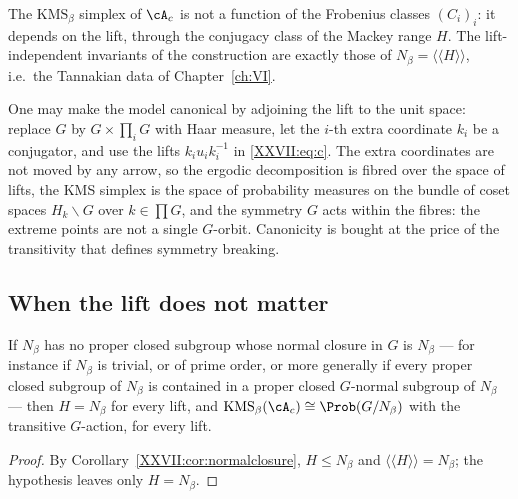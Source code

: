 \begin{corollary}\label{XXVII:cor:nocanonical}
The $\mathrm{KMS}_\beta$ simplex of $\cA_c$ is not a function of the Frobenius classes
$(C_i)_i$: it depends on the lift, through the conjugacy class of the Mackey range $H$. The
lift-independent invariants of the construction are exactly those of $N_\beta=\langle\langle H\rangle\rangle$,
i.e.\ the Tannakian data of Chapter~\ref{ch:VI}.
\end{corollary}

\begin{remark}
One may make the model canonical by adjoining the lift to the unit space: replace $G$ by
$G\times\prod_iG$ with Haar measure, let the $i$-th extra coordinate $k_i$ be a conjugator,
and use the lifts $k_iu_ik_i^{-1}$ in \eqref{XXVII:eq:c}. The extra coordinates are not moved by
any arrow, so the ergodic decomposition is fibred over the space of lifts, the KMS
simplex is the space of probability measures on the bundle of coset spaces
$H_k\backslash G$ over $k\in\prod G$, and the symmetry $G$ acts within the fibres: the
extreme points are not a single $G$-orbit. Canonicity is bought at the price of the
transitivity that defines symmetry breaking.
\end{remark}

\subsection{When the lift does not matter}

\begin{proposition}\label{XXVII:prop:rigid}
If $N_\beta$ has no proper closed subgroup whose normal closure in $G$ is $N_\beta$ --- for
instance if $N_\beta$ is trivial, or of prime order, or more generally if every proper
closed subgroup of $N_\beta$ is contained in a proper closed $G$-normal subgroup of
$N_\beta$ --- then $H=N_\beta$ for every lift, and
$\mathrm{KMS}_\beta(\cA_c)\cong\Prob(G/N_\beta)$ with the transitive $G$-action, for every lift.
\end{proposition}

\begin{proof}
By Corollary~\ref{XXVII:cor:normalclosure}, $H\le N_\beta$ and $\langle\langle H\rangle\rangle=N_\beta$;
the hypothesis leaves only $H=N_\beta$.
\end{proof}

